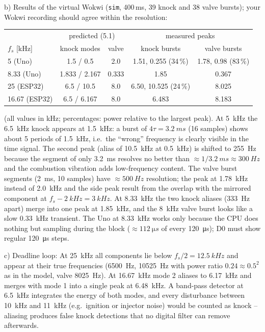 \begin{solution}
b) Results of the virtual Wokwi (\texttt{sim}, 400\,ms, 39 knock and 38 valve
bursts); your Wokwi recording should agree within the resolution:
\begin{center}\small
\begin{tabular}{@{}lcccc@{}}\toprule
 & \multicolumn{2}{c}{predicted (5.1)} & \multicolumn{2}{c}{measured peaks}\\
$f_s$ [kHz] & knock modes & valve & knock bursts & valve bursts\\\midrule
5 (Uno)       & 1.5 / 0.5      & 2.0   & 1.51, 0.255 (34\,\%)  & 1.78, 0.98 (83\,\%)\\
8.33 (Uno)    & 1.833 / 2.167  & 0.333 & 1.85                  & 0.367\\
25 (ESP32)    & 6.5 / 10.5     & 8.0   & 6.50, 10.525 (24\,\%) & 8.025\\
16.67 (ESP32) & 6.5 / 6.167    & 8.0   & 6.483                 & 8.183\\\bottomrule
\end{tabular}
\end{center}
(all values in kHz; percentages: power relative to the largest peak). At \SI{5}{kHz} the
\SI{6.5}{kHz} knock appears at \SI{1.5}{kHz}: a burst of $4\tau=\SI{3.2}{ms}$
(16 samples) shows about 5 periods of \SI{1.5}{kHz}, i.e.\ the ``wrong''
frequency is clearly visible in the time signal. The second peak (alias of
\SI{10.5}{kHz} at \SI{0.5}{kHz}) is shifted to \SI{255}{Hz} because the
segment of only \SI{3.2}{ms} resolves no better than $\approx1/\SI{3.2}{ms}\approx\SI{300}{Hz}$
and the combustion vibration adds low-frequency content. The valve burst
segments (\SI{2}{ms}, 10 samples) have $\approx\SI{500}{Hz}$ resolution; the
peak at \SI{1.78}{kHz} instead of \SI{2.0}{kHz} and the side peak result from
the overlap with the mirrored component at $f_s-\SI{2}{kHz}=\SI{3}{kHz}$. At
\SI{8.33}{kHz} the two knock aliases (\SI{333}{Hz} apart) merge into one peak
at \SI{1.85}{kHz}, and the \SI{8}{kHz} valve burst looks like a slow
\SI{0.33}{kHz} transient. The Uno at \SI{8.33}{kHz} works only because the
CPU does nothing but sampling during the block ($\approx\SI{112}{\micro s}$ of
every \SI{120}{\micro s}); D0 must show regular \SI{120}{\micro s} steps.

c) Deadline loop:
At \SI{25}{kHz} all components lie below $f_s/2=\SI{12.5}{kHz}$ and appear at
their true frequencies (\SI{6500}{Hz}, \SI{10525}{Hz} with power ratio
$0.24\approx0.5^2$ as in the model, valve \SI{8025}{Hz}). At \SI{16.67}{kHz}
mode 2 aliases to \SI{6.17}{kHz} and merges with mode 1 into a single peak at
\SI{6.48}{kHz}. A band-pass detector at \SI{6.5}{kHz} integrates the energy of
both modes, and every disturbance between \SI{10}{kHz} and \SI{11}{kHz}
(e.g.\ ignition or injector noise) would be counted as knock -- aliasing
produces false knock detections that no digital filter can remove afterwards.


\end{solution}
